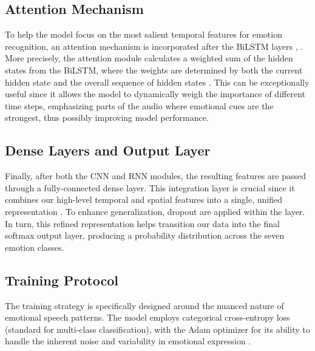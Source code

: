 \documentclass[../main.tex]{subfiles}
\begin{document}
\subsection{Attention Mechanism}
To help the model focus on the most salient temporal features for emotion
recognition, an attention mechanism is incorporated after the BiLSTM layers \citep{Peng2020}, \citep{Chen2018}.
More precisely, the attention module calculates a weighted sum of the hidden
states from the BiLSTM, where the weights are determined by both the current hidden
state and the overall sequence of hidden states \citep{Chen2018}. This can be exceptionally
useful since it allows the model to dynamically weigh the importance of
different time steps, emphasizing parts of the audio where emotional cues are
the strongest, thus possibly improving model performance.

\subsection{Dense Layers and Output Layer}
Finally, after both the CNN and RNN modules, the resulting features are passed
through a fully-connected dense layer. This integration layer is crucial since
it combines our high-level temporal and spatial features into a single, unified
representation \citep{Chen2018}. To enhance generalization, dropout are applied within the layer.
In turn, this refined representation helps transition our data into the final
softmax output layer, producing a probability distribution across the seven
emotion classes.

\subsection{Training Protocol}
The training strategy is specifically designed around the nuanced nature of
emotional speech patterns. The model employs categorical cross-entropy loss
(standard for multi-class classification), with the Adam optimizer for its
ability to handle the inherent noise and variability in emotional expression \citep{Bhatlawande2024}.
\end{document}
